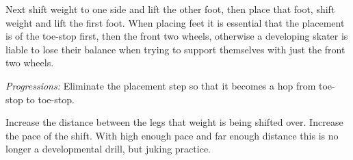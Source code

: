 Next shift weight to one side and lift the other foot, then place that foot, shift weight and lift the first foot. 
When placing feet it is essential that the placement is of the toe-stop first, then the front two wheels, otherwise a developing skater is liable to lose their balance when trying to support themselves with just the front two wheels.


{\it Progressions:}
Eliminate the placement step so that it becomes a hop from toe-stop to toe-stop.  

Increase the distance between the legs that weight is being shifted over. 
Increase the pace of the shift.
With high enough pace and far enough distance this is no longer a developmental drill, but juking practice.
